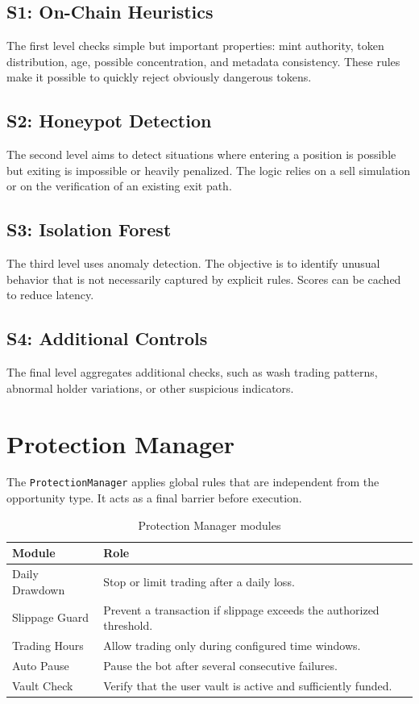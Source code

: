 \documentclass[12pt,a4paper]{report}
\begin{document}
\subsection{S1: On-Chain Heuristics}

The first level checks simple but important properties: mint authority, token distribution, age, possible concentration, and metadata consistency. These rules make it possible to quickly reject obviously dangerous tokens.

\subsection{S2: Honeypot Detection}

The second level aims to detect situations where entering a position is possible but exiting is impossible or heavily penalized. The logic relies on a sell simulation or on the verification of an existing exit path.

\subsection{S3: Isolation Forest}

The third level uses anomaly detection. The objective is to identify unusual behavior that is not necessarily captured by explicit rules. Scores can be cached to reduce latency.

\subsection{S4: Additional Controls}

The final level aggregates additional checks, such as wash trading patterns, abnormal holder variations, or other suspicious indicators.

\section{Protection Manager}

The \texttt{ProtectionManager} applies global rules that are independent from the opportunity type. It acts as a final barrier before execution.

\begin{table}[H]
\centering
\begin{tabularx}{\textwidth}{lX}
\toprule
\textbf{Module} & \textbf{Role} \\
\midrule
Daily Drawdown & Stop or limit trading after a daily loss. \\
Slippage Guard & Prevent a transaction if slippage exceeds the authorized threshold. \\
Trading Hours & Allow trading only during configured time windows. \\
Auto Pause & Pause the bot after several consecutive failures. \\
Vault Check & Verify that the user vault is active and sufficiently funded. \\
\bottomrule
\end{tabularx}
\caption{Protection Manager modules}
\end{table}
\end{document}
